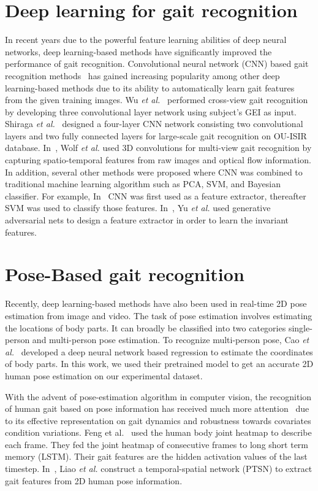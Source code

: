 \section{Deep learning for gait recognition}
In recent years due to the powerful feature learning abilities of deep neural networks, deep learning-based methods have significantly improved the performance of gait recognition. Convolutional neural network (CNN) based gait recognition methods~\cite{Wu_17, Shiraga_16, Wolf_16,Castro_17} has gained increasing popularity among other deep learning-based methods due to its ability to automatically learn gait features from the given training images. Wu \textit{et al.}~\cite{Wu} performed cross-view gait recognition by developing three convolutional layer network using subject's GEI as input. Shiraga \textit{et al.}~\cite{Shiraga_16} designed a four-layer CNN network consisting two convolutional layers and two fully connected layers for large-scale gait recognition on OU-ISIR database. In~\cite{Wolf_16}, Wolf \textit{et al.} used 3D convolutions for multi-view gait recognition  by capturing spatio-temporal features from raw images and optical flow information. In addition, several other methods were proposed where CNN was combined to traditional machine learning algorithm such as PCA, SVM, and Bayesian classifier. For example, In~\cite{Castro_17} CNN was first used as a feature extractor, thereafter SVM was used to classify those features. In~\cite{Yu02}, Yu \textit{et al.} used generative adversarial nets to design a feature extractor in order to learn the invariant features. 


\section{Pose-Based gait recognition}
Recently, deep learning-based methods have also been used in real-time 2D pose estimation from image and video. The task of pose estimation involves estimating the locations of body parts. It can broadly be classified into two categories single-person and multi-person pose estimation. To recognize multi-person pose, Cao \textit{et al.}~\cite{Cao} developed a deep neural network based regression to estimate the coordinates of body parts. In this work, we used their pretrained model to get an accurate 2D human pose estimation on our experimental dataset.

With the advent of pose-estimation algorithm in computer vision, the recognition of human gait based on pose information has received much more attention~\cite{Feng,Liao} due to its effective representation on gait dynamics and robustness towards covariates condition variations. Feng et al.~\cite{Feng} used the human body joint heatmap to describe each frame. They fed the joint heatmap of consecutive frames to long short term memory (LSTM). Their gait features are the hidden activation values of the last timestep. In~\cite{Liao}, Liao \textit{et al.} construct a temporal-spatial network (PTSN) to extract gait features from 2D human pose information.

